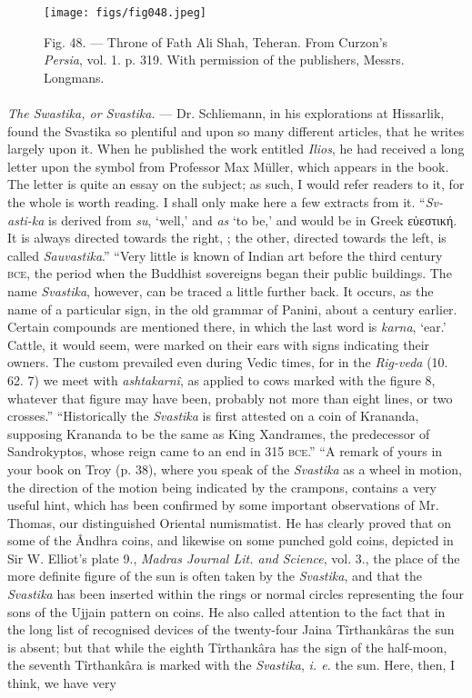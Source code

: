 \documentclass[a4paper, 11pt, oneside, polutonikogreek, english]{article}
\begin{document}
\begin{figure}[H]
\centering
\texttt{[image: figs/fig048.jpeg]}
\caption[Fig. 48. --- Throne of Fath Ali Shah, Teheran.]{Fig. 48. --- Throne of Fath Ali Shah, Teheran. From Curzon's \emph{Persia}, vol. 1. p. 319. With permission of the publishers, Messrs. Longmans.}
\end{figure}
\paragraph{}
\emph{The Swastika, or Svastika.} --- Dr. Schliemann, in his explorations at Hissarlik, found the Svastika so plentiful and upon so many different articles, that he writes largely upon it. When he published the work entitled \emph{Ilios}, he had received a long letter upon the symbol from Professor Max Müller, which appears in the book. The letter is quite an essay on the subject; as such, I would refer readers to it, for the whole is worth reading. I shall only make here a few extracts from it. ``\emph{Sv-asti-ka} is derived from \emph{su}, `well,' and \emph{as} `to be,' and would be in Greek εὐεστική. It is always directed towards the right, ; the other, directed towards the left,  is called \emph{Sauvastika}.'' ``Very little is known of Indian art before the third century \textsc{bce}, the period when the Buddhist sovereigns began their public buildings. The name \emph{Svastika}, however, can be traced a little further back. It occurs, as the name of a particular sign, in the old grammar of Panini, about a century earlier. Certain compounds are mentioned there, in which the last word is \emph{karna}, `ear.' Cattle, it would seem, were marked on their ears with signs indicating their owners. The custom prevailed even during Vedic times, for in the \emph{Rig-veda} (10. 62. 7) we meet with \emph{ashtakarnî}, as applied to cows marked with the figure 8, whatever that figure may have been, probably not more than eight lines, or two crosses.'' ``Historically the \emph{Svastika} is first attested on a coin of Krananda, supposing Krananda to be the same as King Xandrames, the predecessor of Sandrokyptos, whose reign came to an end in 315 \textsc{bce}.'' ``A remark of yours in your book on Troy (p. 38), where you speak of the \emph{Svastika} as a wheel in motion, the direction of the motion being indicated by the crampons, contains a very useful hint, which has been confirmed by some important observations of Mr. Thomas, our distinguished Oriental numismatist. He has clearly proved that on some of the Ândhra coins, and likewise on some punched gold coins, depicted in Sir W. Elliot's plate 9., \emph{Madras Journal Lit. and Science}, vol. 3., the place of the more definite figure of the sun is often taken by the \emph{Svastika}, and that the \emph{Svastika} has been inserted within the rings or normal circles representing the four sons of the Ujjain pattern on coins. He also called attention to the fact that in the long list of recognised devices of the twenty-four Jaina Tîrthankâras the sun is absent; but that while the eighth Tîrthankâra has the sign of the half-moon, the seventh Tîrthankâra is marked with the \emph{Svastika}, \emph{i. e.} the sun. Here, then, I think, we have very 
\end{document}
